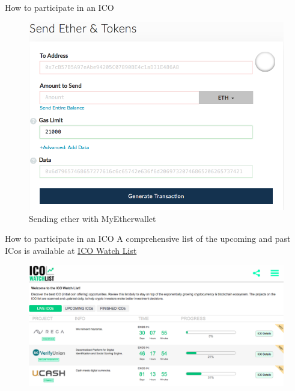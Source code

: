 \documentclass[10pt]{beamer}
\begin{document}

\begin{frame}{How to participate in an ICO}
	\begin{figure}[]
		\centering
		\includegraphics  [scale=0.3]{Images/wallet}
		\caption{Sending ether with MyEtherwallet}
	\end{figure}
\end{frame}


\begin{frame}{How to participate in an ICO}
	A comprehensive list of the upcoming and past ICos is available at \href{https://icowatchlist.com}{ICO Watch List}
	\begin{figure}[]
		\centering
		\includegraphics  [scale=0.2]{Images/ICOlist}
	\end{figure}
\end{frame}
\end{document}
